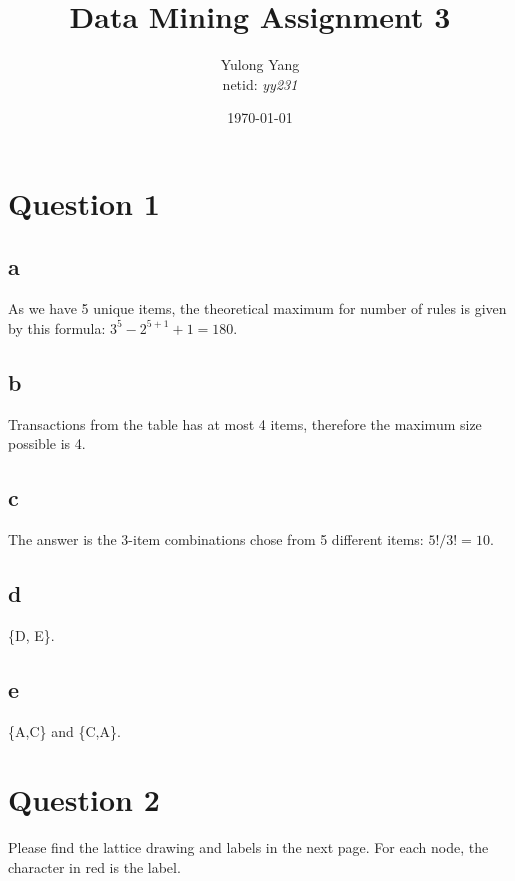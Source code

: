 \documentclass[paper=a4, fontsize=11pt]{scrartcl} %
\title{Data Mining Assignment 3}
\author{Yulong Yang\\ netid: \textit{yy231}} %
\date{\normalsize\today} %
\begin{document}
\maketitle %

\section*{Question 1}

\subsection*{a}

As we have 5 unique items, the theoretical maximum for number of rules is given by this formula: $3^5 - 2^{5+1}+1=180$.

\subsection*{b}

Transactions from the table has at most 4 items, therefore the maximum size possible is 4.

\subsection*{c}

The answer is the 3-item combinations chose from 5 different items: $5!/3!=10$.

\subsection*{d} 

\{D, E\}.

\subsection*{e}

\{A,C\} and \{C,A\}. 

\section*{Question 2}

Please find the lattice drawing and labels in the next page. For each node, the character in red is the label.

\end{document}
